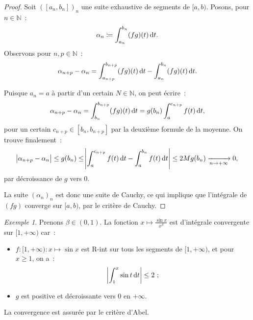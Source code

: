 \documentclass{report}
\theoremstyle{definition}
\theoremstyle{remark}
\newtheorem{ex}{Exemple}[chapter]
\numberwithin{equation}{section}
\newcommand{\N}{\mathbb N}
\newcommand{\pinfty}{{+\infty}}
\begin{document}
			\begin{proof} Soit $([a_n, b_n])_n$ une suite exhaustive de segments de $[a, b)$. Posons, pour $n \in \N$~:
			\begin{equation}
				\alpha_n \coloneqq \int_{a_n}^{b_n}(fg)(t)\dif t.
			\end{equation}
			Observons pour $n, p \in \N$~:
			\begin{equation}
				\alpha_{n+p} - \alpha_n = \int_{a_{n+p}}^{b_{n+p}}(fg)(t)\dif t - \int_{a_n}^{b_n}(fg)(t)\dif t.
			\end{equation}

			Puisque $a_n = a$ à partir d'un certain $N \in \N$, on peut écrire~:
			\begin{equation}
				\alpha_{n+p} - \alpha_n = \int_{b_n}^{b_{n+p}}(fg)(t)\dif t = g(b_n)\int_a^{c_{n+p}}f(t)\dif t,
			\end{equation}
			pour un certain $c_{n+p} \in [b_n, b_{n+p}]$ par la deuxième formule de la moyenne. On trouve finalement~:
			\begin{equation}
				\abs {\alpha_{n+p} - \alpha_n} \leq g(b_n) \leq \abs {\int_a^{c_{n+p}}f(t)\dif t - \int_a^{b_n}f(t)\dif t} \leq 2Mg(b_n) \xrightarrow[n \to \pinfty]{} 0,
			\end{equation}
			par décroissance de $g$ vers $0$.

			La suite $(\alpha_n)_n$ est donc une suite de Cauchy, ce qui implique que l'intégrale de $(fg)$ converge sur $[a, b)$, par le critère de Cauchy.
			\end{proof}

			\begin{ex} Prenons $\beta \in (0, 1)$. La fonction $x \mapsto \frac {\sin x}{x^\beta}$ est d'intégrale convergente sur $[1, \pinfty)$ car~:
			\begin{itemize}
				\item $f : [1, \pinfty) : x \mapsto \sin x$ est R-int sur tous les segments de $[1, \pinfty)$, et pour $x \geq 1$, on a~:
				\begin{equation}
					\abs {\int_1^x\sin t\dif t} \leq 2~;
				\end{equation}
				\item $g$ est positive et décroissante vers $0$ en $\pinfty$.
			\end{itemize}

			La convergence est assurée par le critère d'Abel.
			\end{ex}
\end{document}
